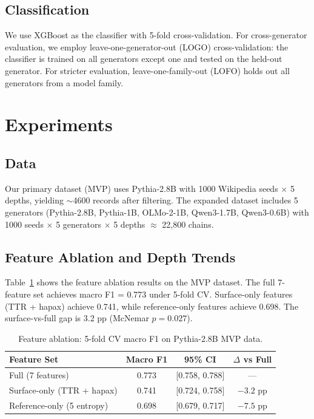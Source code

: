 \documentclass[11pt]{article}
\begin{document}
\subsection{Classification}

We use XGBoost as the classifier with 5-fold cross-validation. For cross-generator evaluation, we employ leave-one-generator-out (LOGO) cross-validation: the classifier is trained on all generators except one and tested on the held-out generator. For stricter evaluation, leave-one-family-out (LOFO) holds out all generators from a model family.

\section{Experiments}
\label{sec:experiments}

\subsection{Data}

Our primary dataset (MVP) uses Pythia-2.8B with 1000 Wikipedia seeds $\times$ 5 depths, yielding $\sim$4600 records after filtering. The expanded dataset includes 5 generators (Pythia-2.8B, Pythia-1B, OLMo-2-1B, Qwen3-1.7B, Qwen3-0.6B) with 1000 seeds $\times$ 5 generators $\times$ 5 depths $\approx$ 22,800 chains.

\subsection{Feature Ablation and Depth Trends}
\label{sec:ablation}

Table~\ref{tab:ablation} shows the feature ablation results on the MVP dataset. The full 7-feature set achieves macro F1 = 0.773 under 5-fold CV. Surface-only features (TTR + hapax) achieve 0.741, while reference-only features achieve 0.698. The surface-vs-full gap is 3.2 pp (McNemar $p = 0.027$).

\begin{table}[t]
\centering
\small
\caption{Feature ablation: 5-fold CV macro F1 on Pythia-2.8B MVP data.}
\label{tab:ablation}
\begin{tabular}{lccc}
\toprule
\textbf{Feature Set} & \textbf{Macro F1} & \textbf{95\% CI} & \textbf{$\Delta$ vs Full} \\
\midrule
Full (7 features) & 0.773 & [0.758, 0.788] & --- \\
Surface-only (TTR + hapax) & 0.741 & [0.724, 0.758] & $-3.2$ pp \\
Reference-only (5 entropy) & 0.698 & [0.679, 0.717] & $-7.5$ pp \\
\bottomrule
\end{tabular}
\end{table}
\end{document}

